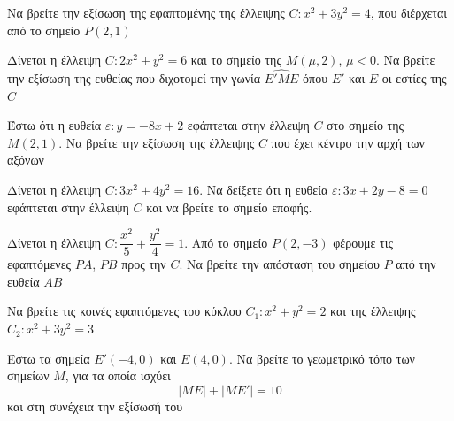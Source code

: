 \documentclass{../../presentation}
\begin{document}
\begin{askisi}
  Να βρείτε την εξίσωση της εφαπτομένης της έλλειψης $C:x^2+3y^2=4$, που διέρχεται από το σημείο $Ρ(2,1)$


\end{askisi}

\begin{askisi}
  Δίνεται η έλλειψη $C:2x^2+y^2=6$ και το σημείο της $Μ(μ,2)$, $μ<0$. Να βρείτε την εξίσωση της ευθείας που διχοτομεί την γωνία $\widehat{Ε'ΜΕ}$ όπου $Ε'$ και $Ε$ οι εστίες της $C$


\end{askisi}

\begin{askisi}
  Έστω ότι η ευθεία $ε:y=-8x+2$ εφάπτεται στην έλλειψη $C$ στο σημείο της $Μ(2,1)$. Να βρείτε την εξίσωση της έλλειψης $C$ που έχει κέντρο την αρχή των αξόνων


\end{askisi}

\begin{askisi}
  Δίνεται η έλλειψη $C:3x^2+4y^2=16$. Να δείξετε ότι η ευθεία $ε:3x+2y-8=0$ εφάπτεται στην έλλειψη $C$ και να βρείτε το σημείο επαφής.


\end{askisi}

\begin{askisi}
  Δίνεται η έλλειψη $C:\dfrac{x^2}{5}+\dfrac{y^2}{4}=1$. Από το σημείο $Ρ(2,-3)$ φέρουμε τις εφαπτόμενες $ΡΑ$, $ΡΒ$ προς την $C$. Να βρείτε την απόσταση του σημείου $Ρ$ από την ευθεία $ΑΒ$


\end{askisi}

\begin{askisi}
  Να βρείτε τις κοινές εφαπτόμενες του κύκλου $C_1:x^2+y^2=2$ και της έλλειψης $C_2:x^2+3y^2=3$


\end{askisi}

\begin{askisi}
  Έστω τα σημεία $Ε'(-4,0)$ και $Ε(4,0)$. Να βρείτε το γεωμετρικό τόπο των σημείων $Μ$, για τα οποία ισχύει
  $$|ΜΕ|+|ΜΕ'|=10$$
  και στη συνέχεια την εξίσωσή του


\end{askisi}
\end{document}
